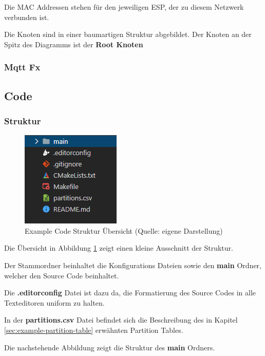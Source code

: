 Die MAC Addressen stehen für den jeweiligen ESP, der zu diesem Netzwerk verbunden ist.

Die Knoten sind in einer baumartigen Struktur abgebildet. Der Knoten an der Spitz des Diagramms ist der \textbf{Root Knoten}

\subsubsection{Mqtt Fx}
\subsection{Code}\label{sec:code}
\subsubsection{Struktur}

\begin{figure}[H]
    \begin{center}
        \includegraphics[scale=0.8]{images/example_code_structure_overview.png}
        \caption{Example Code Struktur Übersicht (Quelle: eigene Darstellung)}
        \label{abb:example_code_structure_overview}
    \end{center}
\end{figure}

Die Übersicht in Abbildung \ref{abb:example_code_structure_overview} zeigt einen kleine Ausschnitt der Struktur.

Der Stammordner beinhaltet die Konfigurations Dateien sowie den \textbf{main} Ordner, welcher den Source Code beinhaltet.

Die \textbf{.editorconfig} Datei ist dazu da, die Formatierung des Source Codes in alle Texteditoren uniform zu halten.

In der \textbf{partitions.csv} Datei befindet sich die Beschreibung des in Kapitel \ref{sec:example-partition-table} erwähnten Partition Tables.

Die nachstehende Abbildung zeigt die Struktur des \textbf{main} Ordners.

